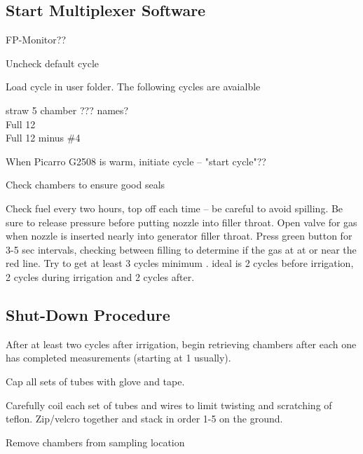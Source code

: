 \documentclass[12pt]{../SOP3}\usepackage[]{graphicx}\usepackage[]{color}
\begin{document}
\subsection*{Start Multiplexer Software}

\NP FP-Monitor??
                               
\NP Uncheck default cycle
                               
\NP Load cycle in user folder. The following cycles are avaialble 

\begin{description}
  \item[straw 5 chamber ??? names?]
  \item[Full 12]
  \item[Full 12 minus \#4]
\end{description}
                               
\NP When Picarro G2508 is warm, initiate cycle -- "start cycle"??
                               
\NP Check chambers to ensure good seals
                               
\NP Check fuel every two hours, top off each time -- be careful to avoid spilling. Be sure to release pressure before putting nozzle into filler throat. Open valve for gas when nozzle is inserted nearly into generator filler throat. Press green button for 3-5 sec intervals, checking between filling to determine if the gas at at or near the red line.
                               Try to get at least 3 cycles minimum . ideal is 2 cycles before irrigation, 2 cycles during irrigation and 2 cycles after. 
                               
\subsection*{Shut-Down Procedure}
                               
\NP After at least two cycles after irrigation, begin retrieving chambers after each one has completed measurements (starting at 1 usually).
                               
\NP Cap all sets of tubes with glove and tape.
                               
\NP Carefully coil each set of tubes and wires to limit twisting and scratching of teflon. Zip/velcro together and stack in order 1-5 on the ground. 
                               
\NP Remove chambers from sampling location
                               
\end{document}
